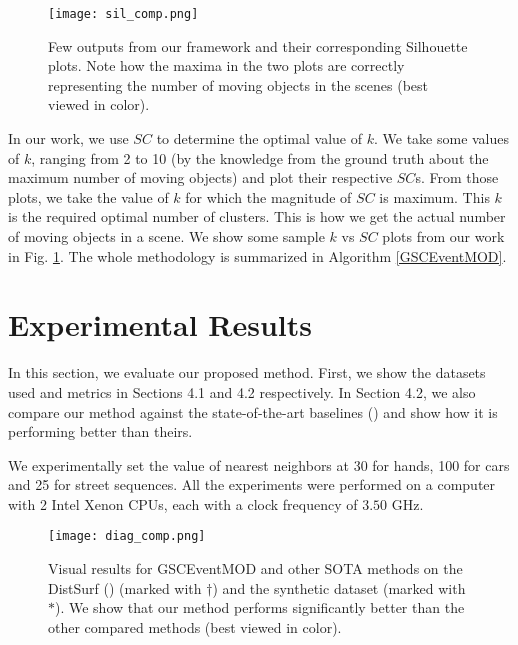 \documentclass{article}
\begin{document}
\begin{figure}
\begin{center}
\texttt{[image: sil\_comp.png]}
\end{center}
   \caption{Few outputs from our framework and their corresponding Silhouette plots. Note how the maxima in the two plots are correctly representing the number of moving objects in the scenes (best viewed in color).}
    \label{fig:sample and sil plots}
\label{fig:sample and sil plots}
\end{figure}

In our work, we use ${SC}$ to determine the optimal value of $k$. We take some values of $k$, ranging from 2 to 10 (by the knowledge from the ground truth about the maximum number of moving objects) and plot their respective ${SC}$s. From those plots, we take the value of $k$ for which the magnitude of ${SC}$ is maximum. This $k$ is the required optimal number of clusters. This is how we get the actual number of moving objects in a scene. We show some sample $k$ vs $SC$ plots from our work in Fig. \ref{fig:sample and sil plots}. The whole methodology is summarized in Algorithm \ref{GSCEventMOD}.


\section{Experimental Results}
In this section, we evaluate our proposed method. First, we show the datasets used and metrics in Sections 4.1 and 4.2 respectively. In Section 4.2, we also compare our method against the state-of-the-art baselines (\cite{pikatkowska2012spatiotemporal,chen2018neuromorphic,hinz2017online}) and show how it is performing better than theirs.

We experimentally set the value of nearest neighbors at 30 for hands, 100 for cars and 25 for street sequences. 
All the experiments were performed on a computer with 2 Intel\textsuperscript{\tiny\textregistered} Xenon\textsuperscript{\tiny\textregistered} CPUs, each with a clock frequency of $3.50$ GHz.

\begin{figure*}
\begin{center}
\texttt{[image: diag\_comp.png]}
\end{center}
   \caption{Visual results for GSCEventMOD and other SOTA methods on the DistSurf (\cite{almatrafi2020distance}) (marked with $\dagger$) and the synthetic dataset (marked with $*$). We show that our method performs significantly better than the other compared methods (best viewed in color).}
    \label{fig:comparison diagram}
\label{fig:comparison diagram}
\end{figure*}
\end{document}
